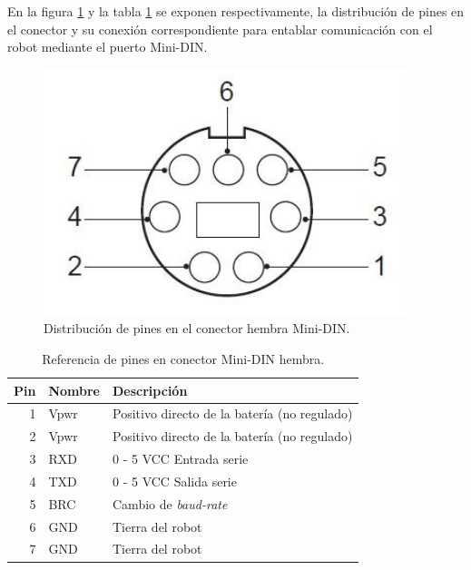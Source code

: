 En la figura \ref{fig:roombaPinout} y la tabla \ref{tab:Pines} se exponen respectivamente, la distribución de pines en el conector y su conexión correspondiente para entablar comunicación con el robot mediante el puerto Mini-DIN.

\begin{figure}[ht]
    \centering
    \includegraphics[scale=.4]{./Figures/pinout.png}
    \caption{Distribución de pines en el conector hembra Mini-DIN.}
    \label{fig:roombaPinout}
\end{figure}

\begin{table}[h]
    \centering
    \caption{Referencia de pines en conector Mini-DIN hembra.}
    \label{tab:Pines}
    \begin{tabular}{rll}
        \toprule
        \multicolumn{1}{l}{Pin} & Nombre & Descripción                                  \\
        \midrule
        1                       & Vpwr   & Positivo directo de la batería (no regulado) \\
        2                       & Vpwr   & Positivo directo de la batería (no regulado) \\
        3                       & RXD    & 0 - 5 VCC Entrada serie                      \\
        4                       & TXD    & 0 - 5 VCC Salida serie                       \\
        5                       & BRC    & Cambio de \textit{baud-rate}                 \\
        6                       & GND    & Tierra del robot                             \\
        7                       & GND    & Tierra del robot                             \\
        \bottomrule
    \end{tabular}
\end{table}

